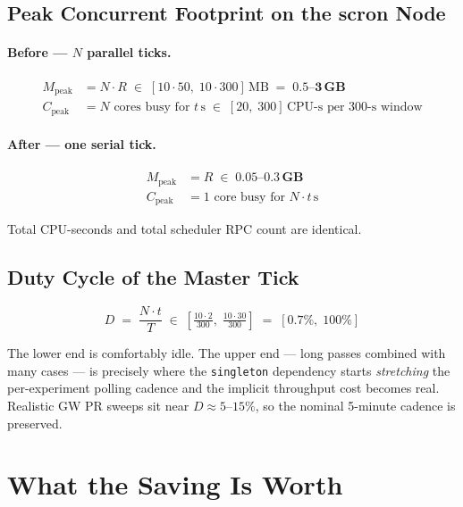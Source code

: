 \documentclass[11pt]{article}
\newcommand{\code}[1]{\texttt{#1}}
\begin{document}
\subsection{Peak Concurrent Footprint on the scron Node}

\paragraph{Before --- $N$ parallel ticks.}
\begin{align}
M_\text{peak} &= N \cdot R \;\in\; [10 \cdot 50,\; 10 \cdot 300]\,\text{MB}
              \;=\; \mathbf{0.5\text{--}3\,\text{GB}} \\
C_\text{peak} &= N \text{ cores busy for } t\,\text{s}
              \;\in\; [20,\; 300]\,\text{CPU-s per } 300\text{-s window}
\end{align}

\paragraph{After --- one serial tick.}
\begin{align}
M_\text{peak} &= R \;\in\; \mathbf{0.05\text{--}0.3\,\text{GB}} \\
C_\text{peak} &= 1 \text{ core busy for } N\cdot t\,\text{s}
\end{align}

Total CPU-seconds and total scheduler RPC count are identical.

\subsection{Duty Cycle of the Master Tick}

\begin{equation}
D \;=\; \frac{N \cdot t}{T} \;\in\;
  \left[\tfrac{10\cdot 2}{300},\; \tfrac{10\cdot 30}{300}\right]
  \;=\; [0.7\%,\; 100\%]
\label{eq:duty}
\end{equation}

The lower end is comfortably idle. The upper end --- long passes
combined with many cases --- is precisely where the
\code{singleton} dependency starts \emph{stretching} the per-experiment
polling cadence and the implicit throughput cost becomes real.
Realistic GW PR sweeps sit near $D \approx 5\text{--}15\%$, so the
nominal 5-minute cadence is preserved.

\section{What the Saving Is Worth}
\label{sec:value}
\end{document}
